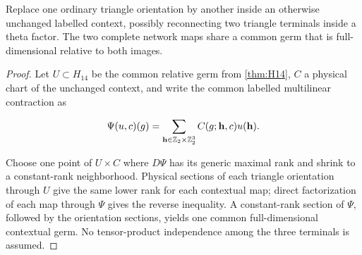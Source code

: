 \begin{lemma}\label{lem:H14-context}
Replace one ordinary triangle orientation by another inside an otherwise
unchanged labelled context, possibly reconnecting two triangle terminals
inside a theta factor.  The two complete network maps share a common germ
that is full-dimensional relative to both images.
\end{lemma}

\begin{proof}
Let \(U\subset H_{14}\) be the common relative germ from
\cref{thm:H14}, \(C\) a physical chart of the unchanged context, and write
the common labelled multilinear contraction as

\[
 \Psi(u,c)(g)=\sum_{\mathbf h\in\mathbb Z_2\times\mathbb Z_2^3}C(g;\mathbf h,c)u(\mathbf h).
\]

Choose one point of \(U\times C\) where \(D\Psi\) has its generic maximal
rank and shrink to a constant-rank neighborhood.  Physical sections of each
triangle orientation through \(U\) give the same lower rank for each
contextual map; direct factorization of each map through \(\Psi\) gives the
reverse inequality.  A constant-rank section of \(\Psi\), followed by the
orientation sections, yields one common full-dimensional contextual germ.
No tensor-product independence among the three terminals is assumed.
\end{proof}
